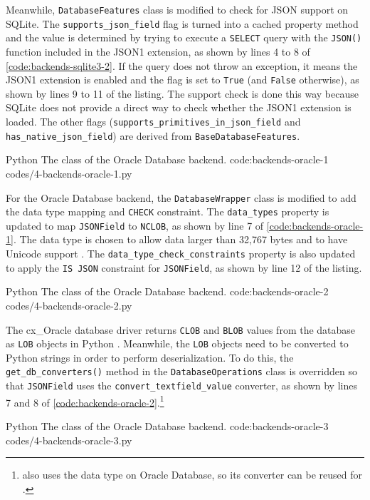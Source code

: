 Meanwhile, \verb|DatabaseFeatures| class is modified to check for JSON support
on SQLite. The \verb|supports_json_field| flag is turned into a cached property
method and the value is determined by trying to execute a \verb|SELECT| query
with the \verb|JSON()| function included in the JSON1 extension, as shown by
lines 4 to 8 of \autoref{code:backends-sqlite3-2}. If the query does not throw
an exception, it means the JSON1 extension is enabled and the flag is set to
\verb|True| (and \verb|False| otherwise), as shown by lines 9 to 11 of the
listing. The support check is done this way because SQLite does not provide a
direct way to check whether the JSON1 extension is loaded. The other flags
(\verb|supports_primitives_in_json_field| and \verb|has_native_json_field|)
are derived from \verb|BaseDatabaseFeatures|.

\listing
{Python}
{The  class of the Oracle Database backend.}
{code:backends-oracle-1}
{codes/4-backends-oracle-1.py}

For the Oracle Database backend, the \verb|DatabaseWrapper| class is modified
to add the data type mapping and \verb|CHECK| constraint. The \verb|data_types|
property is updated to map \verb|JSONField| to \verb|NCLOB|, as shown by line 7
of \autoref{code:backends-oracle-1}. The  data type is chosen to
allow data larger than 32,767 bytes and to have Unicode support
\cite{oracle:overview-json, oracle:database-concepts}. The
\verb|data_type_check_constraints| property is also updated to apply the
\verb|IS JSON| constraint for \verb|JSONField|, as shown by line 12 of the
listing.

\listing
{Python}
{The  class of the Oracle Database backend.}
{code:backends-oracle-2}
{codes/4-backends-oracle-2.py}

The cx\_Oracle database driver returns \verb|CLOB| and \verb|BLOB| values from
the database as \verb|LOB| objects in Python \cite{cxoracle:lob}. Meanwhile,
the \verb|LOB| objects need to be converted to Python strings in order to
perform deserialization. To do this, the \verb|get_db_converters()| method in
the \verb|DatabaseOperations| class is overridden so that \verb|JSONField| uses
the \verb|convert_textfield_value| converter, as shown by lines 7 and 8 of
\autoref{code:backends-oracle-2}.\footnote{ also uses the
 data type on Oracle Database, so its converter can be reused for
.}

\listing
{Python}
{The  class of the Oracle Database backend.}
{code:backends-oracle-3}
{codes/4-backends-oracle-3.py}

